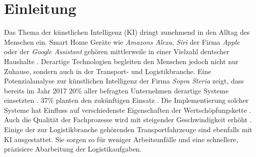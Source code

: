 
\chapter{Einleitung}
\label{ch: Einleitung}
	

		Das Thema der künstlichen Intelligenz (KI) dringt zunehmend in den Alltag des Menschen ein. Smart Home Geräte wie \textit{Amazons Alexa}, \textit{Siri} der Firma \textit{Apple} oder der \textit{Google Assistant} gehören mittlerweile in einer Vielzahl deutscher Haushalte \cite{bvdw}. Derartige Technologien begleiten den Menschen jedoch nicht nur Zuhause, sondern auch in der Transport- und Logistikbranche. Eine Potenzialanalyse zur künstlichen Intelligenz der Firma \textit{Sopra Steria} zeigt, dass bereits im Jahr 2017 20\% aller befragten Unternehmen derartige Systeme einsetzten \cite{sopra}. 37\% planten den zukünftigen Einsatz \cite{sopra}. Die Implementierung solcher Systeme hat Einfluss auf verschiedenste Eigenschaften der Wertschöpfungskette \cite{sopra}. Auch die Qualität der Fachprozesse wird mit steigender Geschwindigkeit erhöht \cite{sopra}. Einige der zur Logistikbranche gehörenden Transportfahrzeuge sind ebenfalls mit KI ausgestattet. Sie sorgen so für weniger Arbeitsunfälle und eine schnellere, präzisiere Abarbeitung der Logistikaufgaben.\\
		
